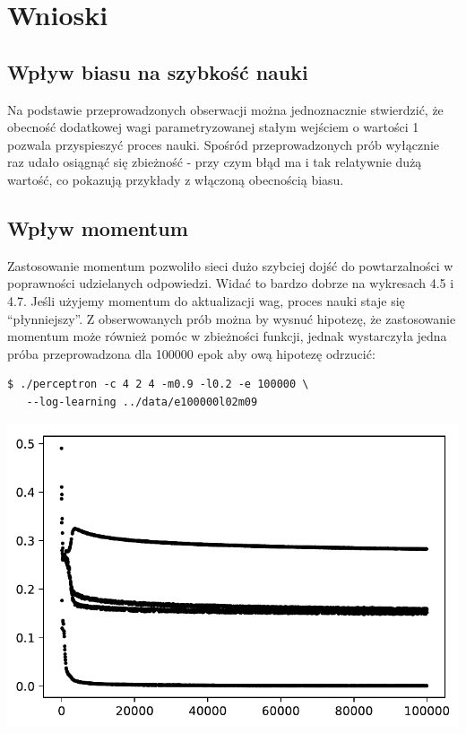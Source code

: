 \documentclass{classrep}
\begin{document}
\section{Wnioski}
\subsection{Wpływ biasu na szybkość nauki}
Na podstawie przeprowadzonych obserwacji można jednoznacznie stwierdzić, że obecność dodatkowej wagi parametryzowanej stałym wejściem o wartości 1 pozwala przyspieszyć proces nauki. Spośród przeprowadzonych prób wyłącznie raz udało osiągnąć się zbieżność - przy czym błąd ma i tak relatywnie dużą wartość, co pokazują przykłady z włączoną obecnością biasu.
\subsection{Wpływ momentum}
Zastosowanie momentum pozwoliło sieci dużo szybciej dojść do powtarzalności w poprawności udzielanych odpowiedzi. Widać to bardzo dobrze na wykresach 4.5 i 4.7. Jeśli użyjemy momentum do aktualizacji wag, proces nauki staje się ``płynniejszy''. Z obserwowanych prób można by wysnuć hipotezę, że zastosowanie momentum może również pomóc w zbieżności funkcji, jednak wystarczyła jedna próba przeprowadzona dla 100000 epok aby ową hipotezę odrzucić:
\begin{lstlisting}[language=xml]
 $ ./perceptron -c 4 2 4 -m0.9 -l0.2 -e 100000 \
   --log-learning ../data/e100000l02m09
\end{lstlisting}

\begin{center}
 \includegraphics{sprawozdanie/output_0_21.pdf}
\end{center}

\end{document}
